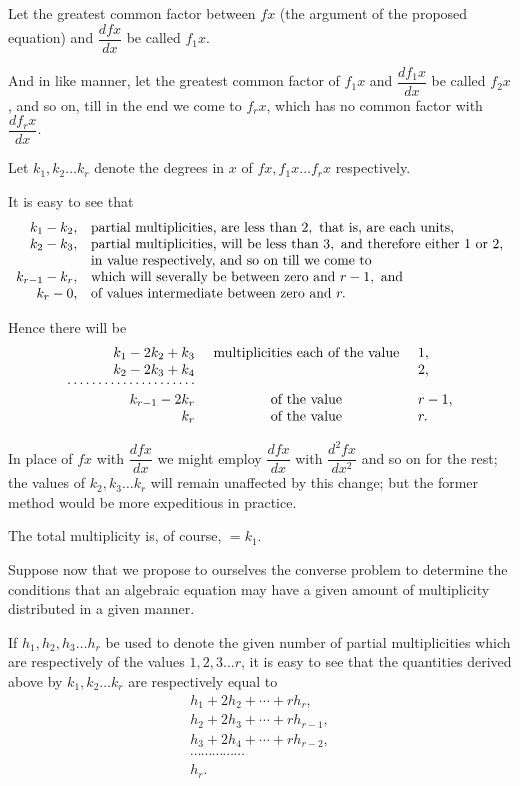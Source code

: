 \documentclass[11pt]{article}
\newcommand{\sourcepage}[1]{\marginpar{\scriptsize p.~#1}}
\begin{document}
Let the greatest common factor between $fx$ (the argument of the proposed equation) and $\dfrac{dfx}{dx}$ be called $f_1x$.

And in like manner, let the greatest common factor of $f_1x$ and $\dfrac{df_1x}{dx}$ be called $f_2x$, and so on, till in the end we come to $f_rx$, which has no common factor with $\dfrac{df_rx}{dx}$.

Let $k_1,k_2\ldots k_r$ denote the degrees in $x$ of $fx,f_1x\ldots f_rx$ respectively.

It is easy to see that
\[
\begin{array}{rl}
k_1-k_2, & \hbox{partial multiplicities, are less than }2,\hbox{ that is, are each units,}\\
k_2-k_3, & \hbox{partial multiplicities, will be less than }3,\hbox{ and therefore either }1\hbox{ or }2,\\
& \hbox{in value respectively, and so on till we come to}\\
k_{r-1}-k_r, & \hbox{which will severally be between zero and }r-1,\hbox{ and}\\
k_r-0, & \hbox{of values intermediate between zero and }r.
\end{array}
\]

\sourcepage{67}
Hence there will be
\[
\begin{array}{rcl}
k_1-2k_2+k_3&\hbox{ multiplicities each of the value }&1,\\
k_2-2k_3+k_4&\hbox{ }&2,\\[-1mm]
\cdots\cdots\cdots\cdots\cdots\cdots\cdots&&\\
k_{r-1}-2k_r&\hbox{ of the value }&r-1,\\
k_r&\hbox{ of the value }&r.
\end{array}
\]

In place of $fx$ with $\dfrac{dfx}{dx}$ we might employ $\dfrac{dfx}{dx}$ with $\dfrac{d^2fx}{dx^2}$ and so on for the rest; the values of $k_2,k_3\ldots k_r$ will remain unaffected by this change; but the former method would be more expeditious in practice.

The total multiplicity is, of course, $=k_1$.

Suppose now that we propose to ourselves the converse problem to determine the conditions that an algebraic equation may have a given amount of multiplicity distributed in a given manner.

If $h_1,h_2,h_3\ldots h_r$ be used to denote the given number of partial multiplicities which are respectively of the values $1,2,3\ldots r$, it is easy to see that the quantities derived above by $k_1,k_2\ldots k_r$ are respectively equal to
\[
\begin{array}{c}
h_1+2h_2+\cdots+rh_r,\\
h_2+2h_3+\cdots+rh_{r-1},\\
h_3+2h_4+\cdots+rh_{r-2},\\
\cdots\cdots\cdots\cdots\cdots\\
h_r.
\end{array}
\]
\end{document}
